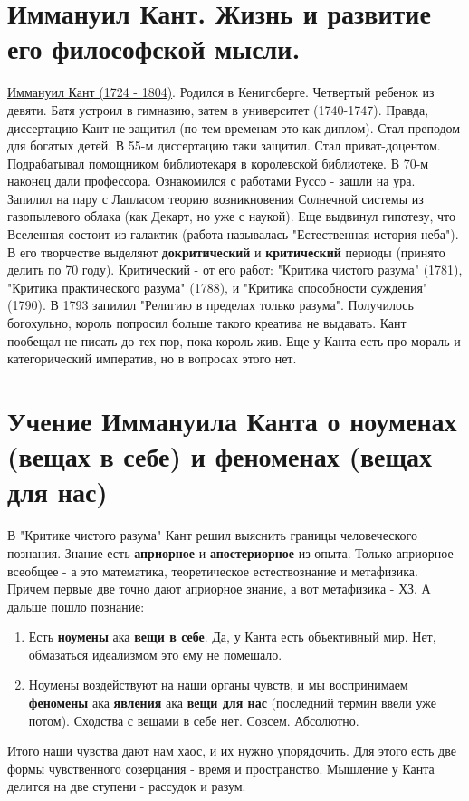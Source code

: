 \section{Иммануил Кант.  Жизнь и развитие его философской мысли.}
\underline{Иммануил Кант (1724 - 1804)}. Родился в Кенигсберге. Четвертый ребенок из девяти. Батя устроил в гимназию, затем в университет (1740-1747). Правда, диссертацию Кант не защитил (по тем временам это как диплом). Стал преподом для богатых детей. В 55-м диссертацию таки защитил. Стал приват-доцентом. Подрабатывал помощником библиотекаря в королевской библиотеке. В 70-м наконец дали профессора. Ознакомился с работами Руссо - зашли на ура. Запилил на пару с Лапласом теорию возникновения Солнечной системы из газопылевого облака (как Декарт, но уже с наукой). Еще выдвинул гипотезу, что Вселенная состоит из галактик (работа называлась "Естественная история неба"). В его творчестве выделяют \textbf{докритический} и \textbf{критический} периоды (принято делить по 70 году). Критический - от его работ: "Критика чистого разума" (1781), "Критика практического разума" (1788), и "Критика способности суждения" (1790). В 1793 запилил "Религию в пределах только разума". Получилось богохульно, король попросил больше такого креатива не выдавать. Кант пообещал не писать до тех пор, пока король жив. Еще у Канта есть про мораль и категорический императив, но в вопросах этого нет.

\section{Учение Иммануила Канта о ноуменах (вещах в себе) и феноменах (вещах для нас)}
В "Критике чистого разума" Кант решил выяснить границы человеческого познания. Знание есть \textbf{априорное} и \textbf{апостериорное} из опыта. Только априорное всеобщее - а это математика, теоретическое естествознание и метафизика. Причем первые две точно дают априорное знание, а вот метафизика - ХЗ. А дальше пошло познание:
\begin{enumerate}
\item Есть \textbf{ноумены} ака \textbf{вещи в себе}. Да, у Канта есть объективный мир. Нет, обмазаться идеализмом это ему не помешало.
\item Ноумены воздействуют на наши органы чувств, и мы воспринимаем \textbf{феномены} ака \textbf{явления} ака \textbf{вещи для нас} (последний термин ввели уже потом). Сходства с вещами в себе нет. Совсем. Абсолютно.
\end{enumerate} 
Итого наши чувства дают нам хаос, и их нужно упорядочить. Для этого есть две формы чувственного созерцания - время и пространство. Мышление у Канта делится на две ступени - рассудок и разум.

